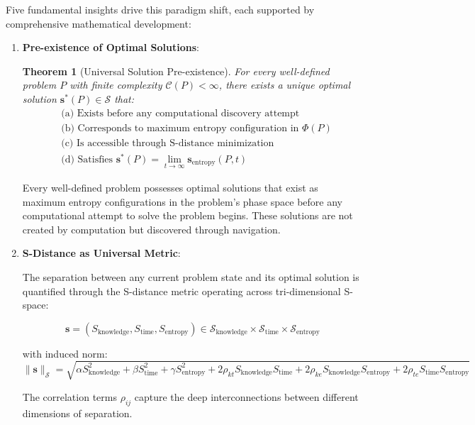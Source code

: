\documentclass[11pt]{article}
\newtheorem{theorem}{Theorem}[section]
\theoremstyle{definition}
\theoremstyle{remark}
\newcommand{\SEntropy}{\mathcal{S}}
\newcommand{\SKnowledge}{\mathcal{S}_{\text{knowledge}}}
\newcommand{\STime}{\mathcal{S}_{\text{time}}}
\newcommand{\SSpace}{\mathcal{S}_{\text{entropy}}}
\begin{document}
Five fundamental insights drive this paradigm shift, each supported by comprehensive mathematical development:

\begin{enumerate}
\item \textbf{Pre-existence of Optimal Solutions}: 

\begin{theorem}[Universal Solution Pre-existence]
For every well-defined problem $P$ with finite complexity $\mathcal{C}(P) < \infty$, there exists a unique optimal solution $\mathbf{s}^*(P) \in \SEntropy$ that:
\begin{align}
&\text{(a) Exists before any computational discovery attempt} \\
&\text{(b) Corresponds to maximum entropy configuration in } \Phi(P) \\
&\text{(c) Is accessible through S-distance minimization} \\
&\text{(d) Satisfies } \mathbf{s}^*(P) = \lim_{t \to \infty} \mathbf{s}_{\text{entropy}}(P, t)
\end{align}
\end{theorem}

Every well-defined problem possesses optimal solutions that exist as maximum entropy configurations in the problem's phase space before any computational attempt to solve the problem begins. These solutions are not created by computation but discovered through navigation.

\item \textbf{S-Distance as Universal Metric}: 

The separation between any current problem state and its optimal solution is quantified through the S-distance metric operating across tri-dimensional S-space:

\begin{equation}
\mathbf{s} = (S_{\text{knowledge}}, S_{\text{time}}, S_{\text{entropy}}) \in \SKnowledge \times \STime \times \SSpace
\end{equation}

with induced norm:
\begin{equation}
\|\mathbf{s}\|_{\SEntropy} = \sqrt{\alpha S_{\text{knowledge}}^2 + \beta S_{\text{time}}^2 + \gamma S_{\text{entropy}}^2 + 2\rho_{kt} S_{\text{knowledge}} S_{\text{time}} + 2\rho_{ke} S_{\text{knowledge}} S_{\text{entropy}} + 2\rho_{te} S_{\text{time}} S_{\text{entropy}}}
\end{equation}

The correlation terms $\rho_{ij}$ capture the deep interconnections between different dimensions of separation.


\end{enumerate}
\end{document}
